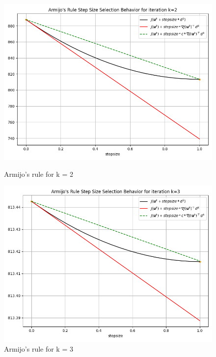 \documentclass[a4paper,11pt,oneside]{book}
\begin{document}
\begin{figure}[ht]
    \begin{minipage}[t]{0.48\textwidth}
        \centering
        \includegraphics[width=\textwidth]{Armijo's_Rule_T2_k=2.png}
        \caption{Armijo's rule for k = 2}
        \label{fig:sinistra}
    \end{minipage}
    \hfill
    \begin{minipage}[t]{0.48\textwidth}
        \centering
        \includegraphics[width=\textwidth]{Armijo's_Rule_T2_k=3.png}
        \caption{Armijo's rule for k = 3}
        \label{fig:destra}
    \end{minipage}
\end{figure}
\end{document}
